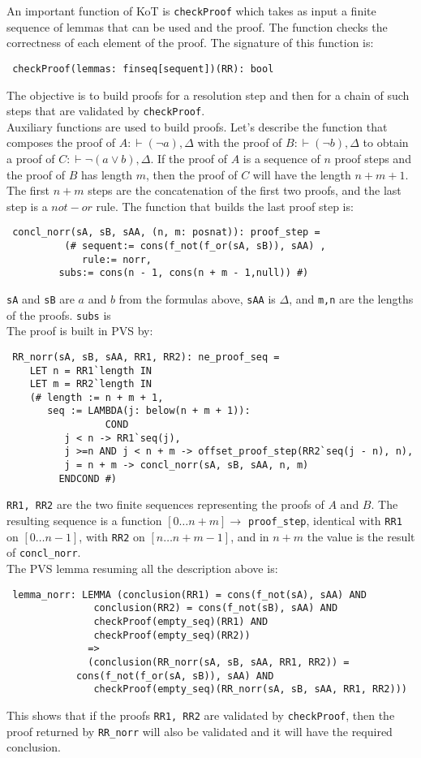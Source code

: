\documentclass[a4paper,12pt]{article}
\begin{document}
An important function of KoT is \verb|checkProof| which takes as input a finite sequence of lemmas that can be used
and the proof. The function checks the correctness of each element of the proof. The signature of this function is:
\begin{verbatim}
 checkProof(lemmas: finseq[sequent])(RR): bool
\end{verbatim}
The objective is to build proofs for a resolution step and then for a chain of such steps that are validated by \verb|checkProof|.
\\Auxiliary functions are used to build proofs. Let's describe the function that composes the proof of 
$A:\vdash(\neg a), \Delta$ with the proof of $B:\vdash(\neg b), \Delta$ to obtain a proof of 
$C:\vdash \neg (a \vee b), \Delta$. If the proof of $A$ is a sequence of $n$ proof steps and the proof of $B$
has length $m$, then the proof of $C$ will have the length $n+m+1$. The first $n+m$ steps are the concatenation
of the first two proofs, and the last step is a $not-or$ rule. The function that builds the last proof step is:
\begin{verbatim}
 concl_norr(sA, sB, sAA, (n, m: posnat)): proof_step = 
          (# sequent:= cons(f_not(f_or(sA, sB)), sAA) , 
    	     rule:= norr,
	     subs:= cons(n - 1, cons(n + m - 1,null)) #)
\end{verbatim}
\verb|sA| and \verb|sB| are $a$ and $b$ from the formulas above, \verb|sAA| is $\Delta$, and \verb|m,n| are the 
lengths of the proofs. \verb|subs| is 
\\The proof is built in PVS by:
\begin{verbatim}
 RR_norr(sA, sB, sAA, RR1, RR2): ne_proof_seq = 
    LET n = RR1`length IN
    LET m = RR2`length IN
    (# length := n + m + 1,
       seq := LAMBDA(j: below(n + m + 1)):
       	      	 COND
		  j < n -> RR1`seq(j),
		  j >=n AND j < n + m -> offset_proof_step(RR2`seq(j - n), n), 
		  j = n + m -> concl_norr(sA, sB, sAA, n, m)
		 ENDCOND #)   
\end{verbatim}
\verb|RR1, RR2| are the two finite sequences representing the proofs of $A$ and $B$. The resulting sequence
is a function $[0 \ldots n+m] \rightarrow$ \verb|proof_step|, identical with \verb|RR1| on $[0 \ldots n-1]$, with 
\verb|RR2| on $[n \ldots n+m-1]$, and in $n+m$ the value is the result of \verb|concl_norr|.
\\The PVS lemma resuming all the description above is:
\begin{verbatim}
 lemma_norr: LEMMA (conclusion(RR1) = cons(f_not(sA), sAA) AND
		       conclusion(RR2) = cons(f_not(sB), sAA) AND
		       checkProof(empty_seq)(RR1) AND
		       checkProof(empty_seq)(RR2))
		      =>
		      (conclusion(RR_norr(sA, sB, sAA, RR1, RR2)) = 
			cons(f_not(f_or(sA, sB)), sAA) AND
		       checkProof(empty_seq)(RR_norr(sA, sB, sAA, RR1, RR2)))
\end{verbatim}
This shows that if the proofs \verb|RR1, RR2| are validated by \verb|checkProof|, then the proof returned by 
\verb|RR_norr| will also be validated and it will have the required conclusion.
\end{document}
